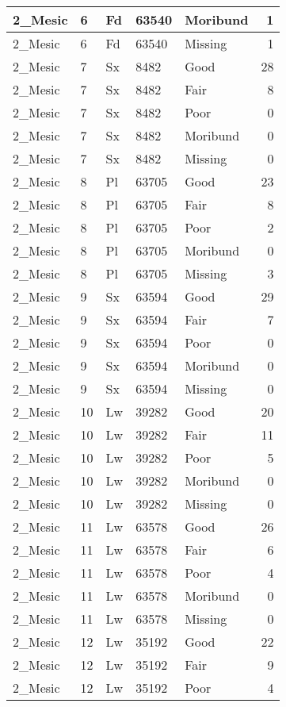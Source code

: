 \documentclass[
]{article}
\begin{document}
\begin{tabular}{l|l|l|l|l|r}
\hline
2\_Mesic & 6 & Fd & 63540 & Moribund & 1\\
\hline
2\_Mesic & 6 & Fd & 63540 & Missing & 1\\
\hline
2\_Mesic & 7 & Sx & 8482 & Good & 28\\
\hline
2\_Mesic & 7 & Sx & 8482 & Fair & 8\\
\hline
2\_Mesic & 7 & Sx & 8482 & Poor & 0\\
\hline
2\_Mesic & 7 & Sx & 8482 & Moribund & 0\\
\hline
2\_Mesic & 7 & Sx & 8482 & Missing & 0\\
\hline
2\_Mesic & 8 & Pl & 63705 & Good & 23\\
\hline
2\_Mesic & 8 & Pl & 63705 & Fair & 8\\
\hline
2\_Mesic & 8 & Pl & 63705 & Poor & 2\\
\hline
2\_Mesic & 8 & Pl & 63705 & Moribund & 0\\
\hline
2\_Mesic & 8 & Pl & 63705 & Missing & 3\\
\hline
2\_Mesic & 9 & Sx & 63594 & Good & 29\\
\hline
2\_Mesic & 9 & Sx & 63594 & Fair & 7\\
\hline
2\_Mesic & 9 & Sx & 63594 & Poor & 0\\
\hline
2\_Mesic & 9 & Sx & 63594 & Moribund & 0\\
\hline
2\_Mesic & 9 & Sx & 63594 & Missing & 0\\
\hline
2\_Mesic & 10 & Lw & 39282 & Good & 20\\
\hline
2\_Mesic & 10 & Lw & 39282 & Fair & 11\\
\hline
2\_Mesic & 10 & Lw & 39282 & Poor & 5\\
\hline
2\_Mesic & 10 & Lw & 39282 & Moribund & 0\\
\hline
2\_Mesic & 10 & Lw & 39282 & Missing & 0\\
\hline
2\_Mesic & 11 & Lw & 63578 & Good & 26\\
\hline
2\_Mesic & 11 & Lw & 63578 & Fair & 6\\
\hline
2\_Mesic & 11 & Lw & 63578 & Poor & 4\\
\hline
2\_Mesic & 11 & Lw & 63578 & Moribund & 0\\
\hline
2\_Mesic & 11 & Lw & 63578 & Missing & 0\\
\hline
2\_Mesic & 12 & Lw & 35192 & Good & 22\\
\hline
2\_Mesic & 12 & Lw & 35192 & Fair & 9\\
\hline
2\_Mesic & 12 & Lw & 35192 & Poor & 4\\

\end{tabular}
\end{document}

